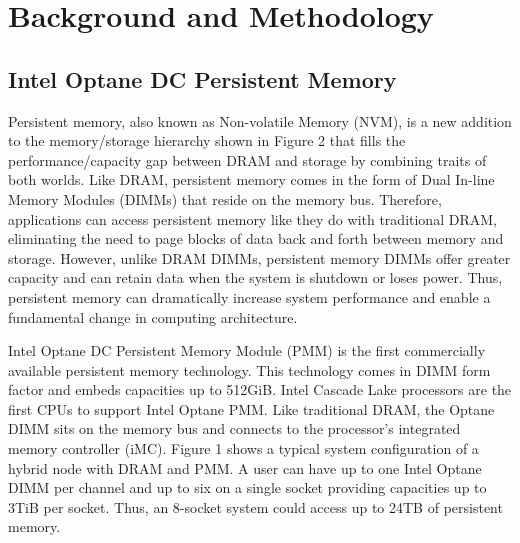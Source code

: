 


\chapter[Background and Methodology]{Background and Methodology}

\section{Intel Optane DC Persistent Memory}

Persistent memory, also known as Non-volatile Memory (NVM), is a new addition to the memory/storage hierarchy shown in Figure 2 that fills the performance/capacity gap between DRAM and storage by combining traits of both worlds. Like DRAM, persistent memory comes in the form of Dual In-line Memory Modules (DIMMs) that reside on the memory bus. Therefore, applications can access persistent memory like they do with traditional DRAM, eliminating the need to page blocks of data back and forth between memory and storage. However, unlike DRAM DIMMs, persistent memory DIMMs offer greater capacity and can retain data when the system is shutdown or loses power. Thus, persistent memory can dramatically increase system performance and enable a fundamental change in computing architecture.

Intel Optane DC Persistent Memory Module (PMM) is the first commercially available persistent memory technology. This technology comes in DIMM form factor and embeds capacities up to 512GiB. Intel Cascade Lake processors are the first CPUs to support Intel Optane PMM. Like traditional DRAM, the Optane DIMM sits on the memory bus and connects to the processor's integrated memory controller (iMC). Figure 1 shows a typical system configuration of a hybrid node with DRAM and PMM. A user can have up to one Intel Optane DIMM per channel and up to six on a single socket providing capacities up to 3TiB per socket. Thus, an 8-socket system could access up to 24TB of persistent memory.

